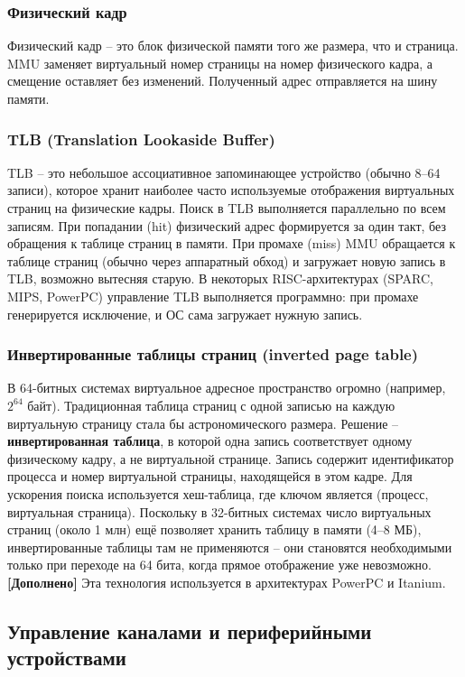 \documentclass[a4paper,12pt]{article}
\begin{document}
\subsubsection{Физический кадр}
Физический кадр – это блок физической памяти того же размера, что и страница. MMU заменяет виртуальный номер страницы на номер физического кадра, а смещение оставляет без изменений. Полученный адрес отправляется на шину памяти.

\subsubsection{TLB (Translation Lookaside Buffer)}
TLB – это небольшое ассоциативное запоминающее устройство (обычно 8–64 записи), которое хранит наиболее часто используемые отображения виртуальных страниц на физические кадры. Поиск в TLB выполняется параллельно по всем записям. При попадании (hit) физический адрес формируется за один такт, без обращения к таблице страниц в памяти. При промахе (miss) MMU обращается к таблице страниц (обычно через аппаратный обход) и загружает новую запись в TLB, возможно вытесняя старую. В некоторых RISC-архитектурах (SPARC, MIPS, PowerPC) управление TLB выполняется программно: при промахе генерируется исключение, и ОС сама загружает нужную запись.

\subsubsection{Инвертированные таблицы страниц (inverted page table)}
В 64-битных системах виртуальное адресное пространство огромно (например, $2^{64}$ байт). Традиционная таблица страниц с одной записью на каждую виртуальную страницу стала бы астрономического размера. Решение – \textbf{инвертированная таблица}, в которой одна запись соответствует одному физическому кадру, а не виртуальной странице. Запись содержит идентификатор процесса и номер виртуальной страницы, находящейся в этом кадре. Для ускорения поиска используется хеш-таблица, где ключом является (процесс, виртуальная страница). Поскольку в 32-битных системах число виртуальных страниц (около 1 млн) ещё позволяет хранить таблицу в памяти (4–8 МБ), инвертированные таблицы там не применяются – они становятся необходимыми только при переходе на 64 бита, когда прямое отображение уже невозможно. \textbf{[Дополнено]} Эта технология используется в архитектурах PowerPC и Itanium.

\subsection{Управление каналами и периферийными устройствами}
\end{document}
